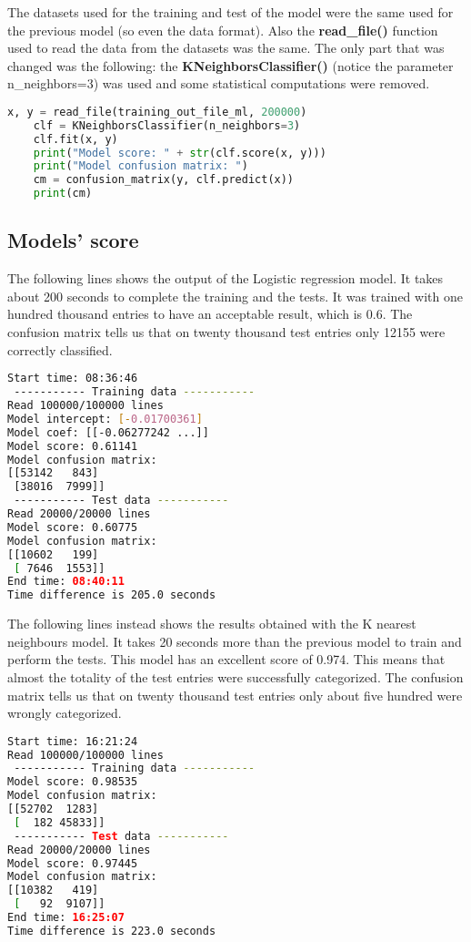 \documentclass[a4paper,10pt]{memoir}
\begin{document}
The datasets used for the training and test of the model were the same used for the previous model (so even the data format). Also the \textbf{read\_file()} function used to read the data from the datasets was the same. The only part that was changed was the following: the \textbf{KNeighborsClassifier()} (notice the parameter n\_neighbors=3) was used and some statistical computations were removed.
\begin{lstlisting}[language=python,firstnumber=72]
    x, y = read_file(training_out_file_ml, 200000)
    clf = KNeighborsClassifier(n_neighbors=3)
    clf.fit(x, y)
    print("Model score: " + str(clf.score(x, y)))
    print("Model confusion matrix: ")
    cm = confusion_matrix(y, clf.predict(x))
    print(cm)
\end{lstlisting}

\subsection{Models' score}
The following lines shows the output of the Logistic regression model. It takes about 200 seconds to complete the training and the tests. It was trained with one hundred thousand entries to have an acceptable result, which is 0.6. The confusion matrix tells us that on twenty thousand test entries only 12155 were correctly classified.
\begin{lstlisting}[language=bash]
Start time: 08:36:46
 ----------- Training data -----------
Read 100000/100000 lines
Model intercept: [-0.01700361]
Model coef: [[-0.06277242 ...]]
Model score: 0.61141
Model confusion matrix: 
[[53142   843]
 [38016  7999]]
 ----------- Test data -----------
Read 20000/20000 lines
Model score: 0.60775
Model confusion matrix: 
[[10602   199]
 [ 7646  1553]]
End time: 08:40:11
Time difference is 205.0 seconds
\end{lstlisting}

The following lines instead shows the results obtained with the K nearest neighbours model. It takes 20 seconds more than the previous model to train and perform the tests. This model has an excellent score of 0.974. This means that almost the totality of the test entries were successfully categorized. The confusion matrix tells us that on twenty thousand test entries only about five hundred were wrongly categorized. 
\begin{lstlisting}[language=bash]
Start time: 16:21:24
Read 100000/100000 lines
 ----------- Training data -----------
Model score: 0.98535
Model confusion matrix: 
[[52702  1283]
 [  182 45833]]
 ----------- Test data -----------
Read 20000/20000 lines
Model score: 0.97445
Model confusion matrix: 
[[10382   419]
 [   92  9107]]
End time: 16:25:07
Time difference is 223.0 seconds
\end{lstlisting}
\end{document}
